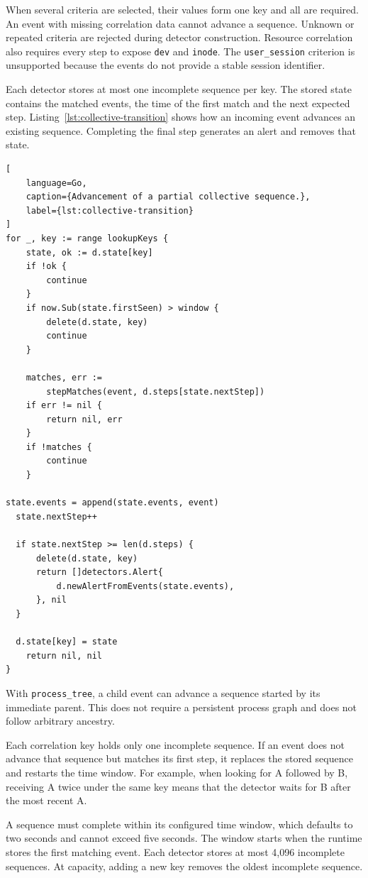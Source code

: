When several criteria are selected, their values form one key and all
are required. An event with missing correlation data cannot advance
a sequence. Unknown or repeated criteria are rejected during detector
construction. Resource correlation also requires every step to expose
\texttt{dev} and \texttt{inode}. The \texttt{user\_session} criterion is
unsupported because the events do not provide a stable session identifier.

Each detector stores at most one incomplete sequence per key. The stored
state contains the matched events, the time of the first match and the
next expected step. Listing~\ref{lst:collective-transition} shows how an
incoming event advances an existing sequence. Completing the final step
generates an alert and removes that state.

\begin{lstlisting}[
    language=Go,
    caption={Advancement of a partial collective sequence.},
    label={lst:collective-transition}
]
for _, key := range lookupKeys {
    state, ok := d.state[key]
    if !ok {
        continue
    }
    if now.Sub(state.firstSeen) > window {
        delete(d.state, key)
        continue
    }

    matches, err :=
        stepMatches(event, d.steps[state.nextStep])
    if err != nil {
        return nil, err
    }
    if !matches {
        continue
    }

state.events = append(state.events, event)
  state.nextStep++

  if state.nextStep >= len(d.steps) {
      delete(d.state, key)
      return []detectors.Alert{
          d.newAlertFromEvents(state.events),
      }, nil
  }

  d.state[key] = state
    return nil, nil
}
\end{lstlisting}

With \texttt{process\_tree}, a child event can
advance a sequence started by its immediate parent. This does not require
a persistent process graph and does not follow arbitrary ancestry.

Each correlation key holds only one incomplete sequence. If an event
does not advance that sequence but matches its first step, it replaces
the stored sequence and restarts the time window. For example, when
looking for A followed by B, receiving A twice under the same key means
that the detector waits for B after the most recent A.

A sequence must complete within its configured time window, which defaults
to two seconds and cannot exceed five seconds. The window starts when the
runtime stores the first matching event. Each detector stores at most 4,096 incomplete sequences.
At capacity, adding a new key removes the oldest incomplete sequence.

